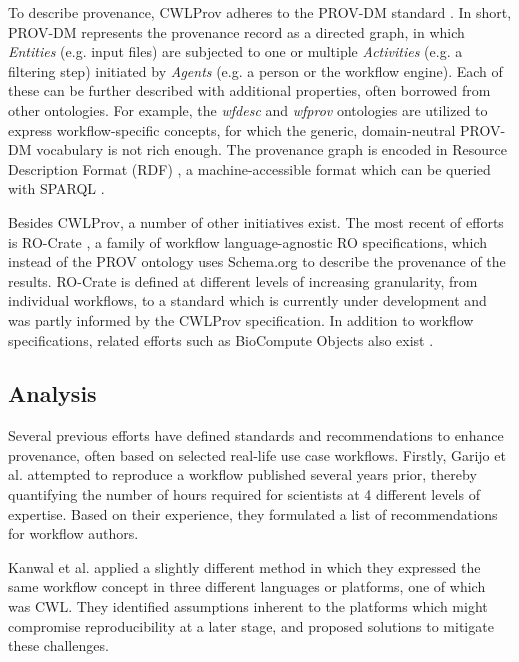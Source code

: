 To describe provenance, CWLProv adheres to the PROV-DM standard \cite{PROVDM}. In short, PROV-DM represents the provenance record as a directed graph, in which \emph{Entities} (e.g. input files) are subjected to one or multiple \emph{Activities} (e.g. a filtering step) initiated by \emph{Agents} (e.g. a person or the workflow engine). Each of these can be further described with additional properties, often borrowed from other ontologies. For example, the \emph{wfdesc} \cite{soiland-reyesWfdescOntology2016} and \emph{wfprov} \cite{soiland-reyesWfprovOntology2016} ontologies are utilized to express workflow-specific concepts, for which the generic, domain-neutral PROV-DM vocabulary is not rich enough. The provenance graph is encoded in Resource Description Format (RDF) \cite{cyganiakRDFConceptsAbstract2014}, a machine-accessible format which can be queried with SPARQL \cite{sparql11-overview}.

Besides CWLProv, a number of other initiatives exist. The most recent of efforts is RO-Crate \cite{SoilandReyes2022a}, a family of workflow language-agnostic RO specifications, which instead of the PROV ontology uses Schema.org to describe the provenance of the results. RO-Crate is defined at different levels of increasing granularity, from individual workflows, to a standard which is currently under development and was partly informed by the CWLProv specification. In addition to workflow specifications, related efforts such as BioCompute Objects also exist \cite{alterovitzEnablingPrecisionMedicine2018}. 

\subsection{Analysis}

Several previous efforts have defined standards and recommendations to enhance provenance, often based on selected real-life use case workflows. Firstly, Garijo et al. \cite{garijoQuantifyingReproducibilityComputational2013} attempted to reproduce a workflow published several years prior, thereby quantifying the number of hours required for scientists at 4 different levels of expertise. Based on their experience, they formulated a list of recommendations for workflow authors. 

Kanwal et al. \cite{kanwalInvestigatingReproducibilityTracking2017} applied a slightly different method in which they expressed the same workflow concept in three different languages or platforms, one of which was CWL. They identified assumptions inherent to the platforms which might compromise reproducibility at a later stage, and proposed solutions to mitigate these challenges. 

